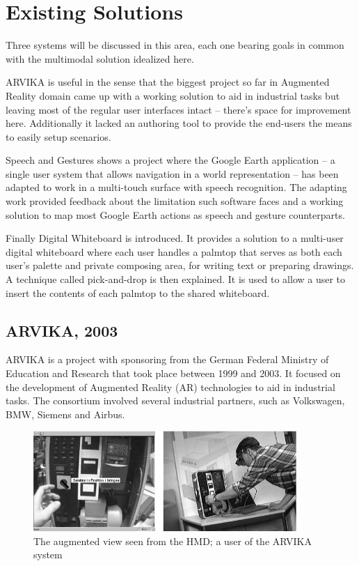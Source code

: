 \section{Existing Solutions}



Three systems will be discussed in this area, each one bearing goals in common
with the multimodal solution idealized here.

ARVIKA is useful in the sense that the biggest project so far in Augmented Reality
domain came up with a working solution to aid in industrial tasks but leaving most
of the regular user interfaces intact -- there's space for improvement here.
Additionally it lacked an authoring tool to provide the end-users the means to
easily setup scenarios.

Speech and Gestures shows a project where the Google Earth \cite{SITE-EARTH} application
-- a single user system that allows navigation in a world representation -- has been adapted to
work in a multi-touch surface with speech recognition.
The adapting work provided feedback about the limitation such software faces 
and a working solution to map most Google Earth actions as speech and gesture counterparts.

Finally Digital Whiteboard is introduced. It provides a solution to a multi-user digital
whiteboard where each user handles a palmtop that serves as both each user's palette and
private composing area, for writing text or preparing drawings.
A technique called pick-and-drop is then explained. It is used to allow a user to insert
the contents of each palmtop to the shared whiteboard.



\subsection{ARVIKA, 2003}

ARVIKA \cite{ARVIKA} is a project with sponsoring from the
German Federal Ministry of Education and Research that took place between 1999 and 2003.
It focused on the development of Augmented Reality (AR) technologies to aid in industrial tasks.
The consortium involved several industrial partners, such as Volkswagen, BMW, Siemens and Airbus.

\begin{figure}[!ht]
    \centering
    \includegraphics[width=10cm]{gfx/arvika.png}
    \caption{The augmented view seen from the HMD; a user of the ARVIKA system}
    \label{FIG-ARVIKA}
\end{figure}

